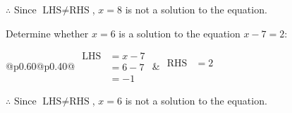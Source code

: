 \documentclass[12pt]{article}
\newcounter{minipagecount}
\begin{document}
\begin{multicols}{2}
\begin{minipage}[t]{0.40\textwidth}
    \noindent \(\therefore\) Since \(\text{LHS} \neq \text{RHS}\), \(x = 8\) is not  a solution to the equation.

\end{minipage}

 \vspace*{16pt}
\noindent{(\theminipagecount)}\hspace{0.1mm} %
\begin{minipage}[t]{0.40\textwidth} %

    \noindent Determine whether \(x = 6\) is a solution to the equation \(x - 7 = 2\):
    \vspace{4pt}  %

    \noindent
    \renewcommand{\arraystretch}{1.3} %
    \begin{tabular}{@{}p{0.60\linewidth}@{}p{0.40\linewidth}@{}}
        \(\begin{aligned}
            \text{LHS} &= x - 7 \\
                    &= 6 - 7 \\
                    &= -1
        \end{aligned}\) &
        \(\begin{aligned}
            \text{RHS} &= 2\\
                    & \\
                    &
        \end{aligned}\)
    \end{tabular}
    \renewcommand{\arraystretch}{1.0} %
    \vspace{2pt}  %

    \noindent \(\therefore\) Since \(\text{LHS} \neq \text{RHS}\), \(x = 6\) is not  a solution to the equation.

\end{minipage}

 \vspace*{16pt}
\noindent{(\theminipagecount)}\hspace{0.1mm} %
\begin{minipage}[t]{0.40\textwidth} %


\end{minipage}
\end{multicols}
\end{document}
